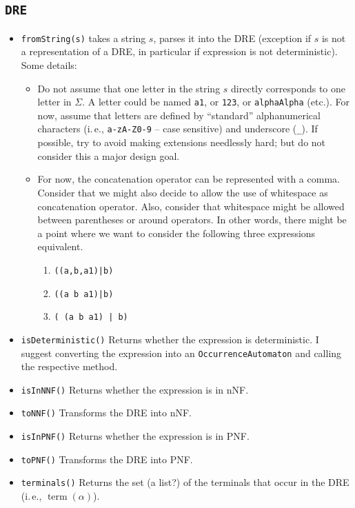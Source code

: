 \documentclass[a4paper,11pt, svgnames,titlepage]{article}
\DeclareMathOperator{\term}{term}
\begin{document}
\subsection{\texttt{DRE}}\label{sec:des:dre}
\begin{itemize}
	\item\texttt{fromString(s)} takes a string $s$, parses it into the DRE (exception if $s$ is not a representation of a DRE, in particular if expression is not deterministic). Some details:
	\begin{itemize}
		\item Do not assume that one letter in the string $s$ directly corresponds to one letter in $\Sigma$. A letter could be named \texttt{a1}, or \texttt{123}, or \texttt{alphaAlpha} (etc.). For now, assume that letters are defined by ``standard'' alphanumerical characters (i.\,e., \texttt{a-zA-Z0-9} -- case sensitive) and underscore (\texttt{\_}). If possible, try to avoid making extensions needlessly hard; but do not consider this a major design goal.
		\item For now, the concatenation operator can be represented with a comma. Consider that we might also decide to allow the use of whitespace as concatenation operator. Also, consider that whitespace might be allowed between parentheses or around operators. In other words, there might be a point where we want to consider the following three expressions equivalent. \begin{enumerate}
			\item \texttt{((a,b,a1)|b)}
			\item \texttt{((a b a1)|b)}
			\item \texttt{( (a b a1) | b)}
		\end{enumerate} 
	\end{itemize}
	\item\texttt{isDeterministic()} Returns whether the expression is deterministic. I suggest converting the expression into an \texttt{OccurrenceAutomaton} and calling the respective method.
	\item\texttt{isInNNF()} Returns whether the expression is in nNF.
	\item\texttt{toNNF()} Transforms the DRE into nNF.
	\item\texttt{isInPNF()} Returns whether the expression is in PNF.
	\item\texttt{toPNF()} Transforms the DRE into PNF.
	\item\texttt{terminals()} Returns the set (a list?) of the terminals that occur in the DRE (i.\,e., $\term(\alpha)$).

\end{itemize}
\end{document}
